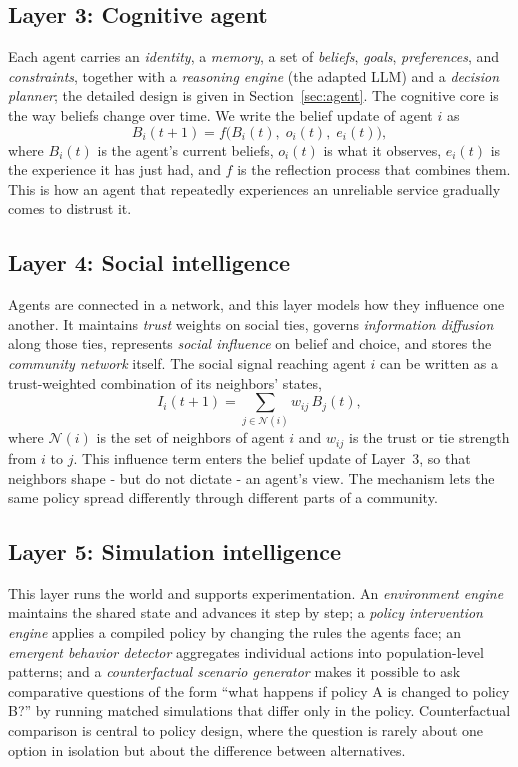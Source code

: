 \documentclass[conference]{IEEEtran}
\begin{document}
\subsection{Layer 3: Cognitive agent}
Each agent carries an \emph{identity}, a \emph{memory}, a set of \emph{beliefs}, \emph{goals}, \emph{preferences}, and \emph{constraints}, together with a \emph{reasoning engine} (the adapted LLM) and a \emph{decision planner}; the detailed design is given in Section~\ref{sec:agent}. The cognitive core is the way beliefs change over time. We write the belief update of agent $i$ as
\begin{equation}
B_i(t+1) = f\big(B_i(t),\; o_i(t),\; e_i(t)\big),
\end{equation}
where $B_i(t)$ is the agent's current beliefs, $o_i(t)$ is what it observes, $e_i(t)$ is the experience it has just had, and $f$ is the reflection process that combines them. This is how an agent that repeatedly experiences an unreliable service gradually comes to distrust it.

\subsection{Layer 4: Social intelligence}
Agents are connected in a network, and this layer models how they influence one another. It maintains \emph{trust} weights on social ties, governs \emph{information diffusion} along those ties, represents \emph{social influence} on belief and choice, and stores the \emph{community network} itself. The social signal reaching agent $i$ can be written as a trust-weighted combination of its neighbors' states,
\begin{equation}
I_i(t+1) = \sum_{j \in \mathcal{N}(i)} w_{ij}\, B_j(t),
\end{equation}
where $\mathcal{N}(i)$ is the set of neighbors of agent $i$ and $w_{ij}$ is the trust or tie strength from $i$ to $j$. This influence term enters the belief update of Layer~3, so that neighbors shape - but do not dictate - an agent's view. The mechanism lets the same policy spread differently through different parts of a community.

\subsection{Layer 5: Simulation intelligence}
This layer runs the world and supports experimentation. An \emph{environment engine} maintains the shared state and advances it step by step; a \emph{policy intervention engine} applies a compiled policy by changing the rules the agents face; an \emph{emergent behavior detector} aggregates individual actions into population-level patterns; and a \emph{counterfactual scenario generator} makes it possible to ask comparative questions of the form ``what happens if policy A is changed to policy B?'' by running matched simulations that differ only in the policy. Counterfactual comparison is central to policy design, where the question is rarely about one option in isolation but about the difference between alternatives.
\end{document}
